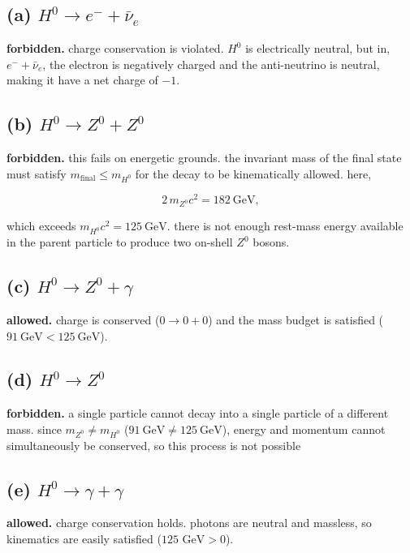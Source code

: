 \documentclass{article}
\begin{document}
\subsection{(a) $H^0 \rightarrow e^- + \bar{\nu}_e$}

\textbf{forbidden.} charge conservation is violated. $H^0$ is electrically neutral, 
but in, $e^- + \bar{\nu}_e$, the electron is negatively charged and the anti-neutrino 
is neutral, making it have a net charge of $-1$.

\subsection{(b) $H^0 \rightarrow Z^0 + Z^0$}

\textbf{forbidden.} this fails on energetic grounds. the invariant mass of the final state
must satisfy $m_{\text{final}} \leq m_{H^0}$ for the decay to be kinematically allowed. here,

\[
2\,m_{Z^0}c^2 = 182~\mathrm{GeV},
\]

which exceeds $m_{H^0}c^2 = 125~\mathrm{GeV}$. there is not enough rest-mass energy
available in the parent particle to produce two on-shell $Z^0$ bosons.

\subsection{(c) $H^0 \rightarrow Z^0 + \gamma$}

\textbf{allowed.} charge is conserved ($0 \rightarrow 0+0$) and the mass budget is
satisfied ($91~\mathrm{GeV} < 125~\mathrm{GeV}$).

\subsection{(d) $H^0 \rightarrow Z^0$}

\textbf{forbidden.} a single particle cannot decay into a single particle of a different mass.
since $m_{Z^0} \neq m_{H^0}$ ($91~\mathrm{GeV} \neq 125~\mathrm{GeV}$), energy and momentum cannot simultaneously be
conserved, so this process is not possible

\subsection{(e) $H^0 \rightarrow \gamma + \gamma$}

\textbf{allowed.} charge conservation holds. photons are neutral and massless, so kinematics are easily satisfied 
($125\text{ GeV} > 0$).
\end{document}
